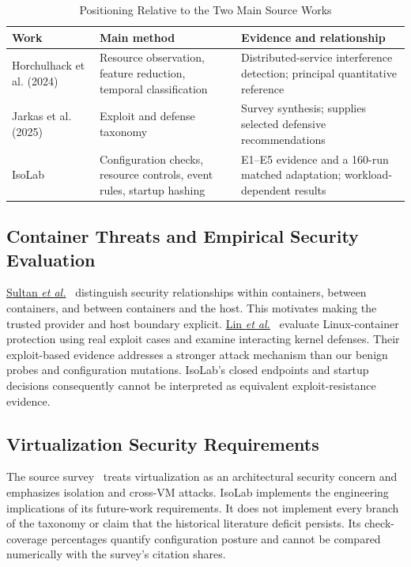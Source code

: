 \documentclass[conference,letterpaper]{IEEEtran}
\begin{document}
\begin{table}[t]
\caption{Positioning Relative to the Two Main Source Works}
\label{tab:positioning}
\centering
\footnotesize
\renewcommand{\arraystretch}{1.13}
\begin{tabular}{@{}>{\raggedright\arraybackslash}p{}>{\raggedright\arraybackslash}p{}>{\raggedright\arraybackslash}p{}@{}}
\toprule
Work & Main method & Evidence and relationship \\ \midrule
Horchulhack et al. (2024)~\cite{qos2024} & Resource observation, feature reduction, temporal classification & Distributed-service interference detection; principal quantitative reference \\
Jarkas et al. (2025)~\cite{acm2025} & Exploit and defense taxonomy & Survey synthesis; supplies selected defensive recommendations \\
IsoLab & Configuration checks, resource controls, event rules, startup hashing & E1--E5 evidence and a 160-run matched adaptation; workload-dependent results \\
\bottomrule
\end{tabular}
\end{table}

\subsection{Container Threats and Empirical Security Evaluation}
\href{https://doi.org/10.1109/ACCESS.2019.2911732}{Sultan \emph{et al.}}~\cite{sultan} distinguish security relationships within containers, between containers, and between containers and the host. This motivates making the trusted provider and host boundary explicit. \href{https://doi.org/10.1145/3274694.3274720}{Lin \emph{et al.}}~\cite{lin2018} evaluate Linux-container protection using real exploit cases and examine interacting kernel defenses. Their exploit-based evidence addresses a stronger attack mechanism than our benign probes and configuration mutations. IsoLab's closed endpoints and startup decisions consequently cannot be interpreted as equivalent exploit-resistance evidence.

\subsection{Virtualization Security Requirements}
The source survey~\cite{gonzalez} treats virtualization as an architectural security concern and emphasizes isolation and cross-VM attacks. IsoLab implements the engineering implications of its future-work requirements. It does not implement every branch of the taxonomy or claim that the historical literature deficit persists. Its check-coverage percentages quantify configuration posture and cannot be compared numerically with the survey's citation shares.
\end{document}
